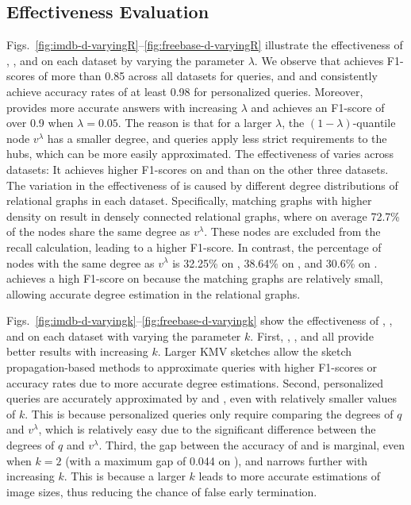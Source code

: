 \subsection{Effectiveness Evaluation}
\label{sec:effective}

Figs.~\ref{fig:imdb-d-varyingR}--\ref{fig:freebase-d-varyingR} illustrate the effectiveness of \glod, \perd, and \perde on each dataset by varying the parameter $\lambda$.
We observe that \glod achieves F1-scores of more than 0.85 across all datasets for \ced queries, and \perd and \perde consistently achieve accuracy rates of at least 0.98 for personalized \ced queries.
Moreover, \glod provides more accurate answers with increasing $\lambda$ and achieves an F1-score of over 0.9 when $\lambda=0.05$.
The reason is that for a larger $\lambda$, the $(1-\lambda)$-quantile node $v^\lambda$ has a smaller degree, and \ced queries apply less strict requirements to the hubs, which can be more easily approximated. The effectiveness of \glod varies across datasets: It achieves higher F1-scores on \dsimdb and \dsacm than on the other three datasets. The variation in the effectiveness of \glod is caused by different degree distributions of relational graphs in each dataset. Specifically, matching graphs with higher density on \dsacm result in densely connected relational graphs, where on average 72.7\% of the nodes share the same degree as $v^\lambda$. These nodes are excluded from the recall calculation, leading to a higher F1-score. In contrast, the percentage of nodes with the same degree as $v^\lambda$ is 32.25\% on \dsdblp, 38.64\% on \dspubmed, and 30.6\% on \dsfreebase. \glod achieves a high F1-score on \dsimdb because the matching graphs are relatively small, allowing accurate degree estimation in the relational graphs.

Figs.~\ref{fig:imdb-d-varyingk}--\ref{fig:freebase-d-varyingk} show the effectiveness of \glod, \perd, and \perde on each dataset with varying the parameter $k$. 
First, \glod, \perd, and \perde all provide better results with increasing $k$. Larger KMV sketches allow the sketch propagation-based methods to approximate \ced queries with higher F1-scores or accuracy rates due to more accurate degree estimations.
Second, personalized \ced queries are accurately approximated by \perd and \perde, even with relatively smaller values of $k$.
This is because personalized \ced queries only require comparing the degrees of $q$ and $v^\lambda$, which is relatively easy due to the significant difference between the degrees of $q$ and $v^\lambda$.
Third, the gap between the accuracy of \perde and \perd is marginal, even when $k=2$ (with a maximum gap of 0.044 on \dsdblp), and narrows further with increasing $k$. This is because a larger $k$ leads to more accurate estimations of image sizes, thus reducing the chance of false early termination.

